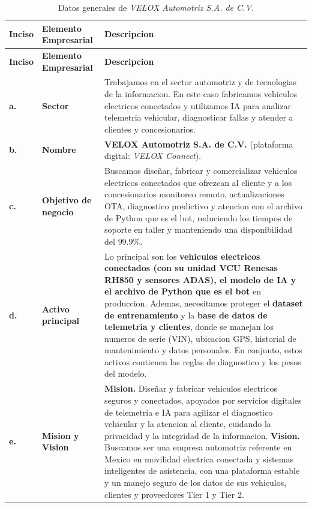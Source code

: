 \documentclass[letterpaper,11pt]{article}
\begin{document}
\vspace{0.2cm}
\begingroup
\footnotesize
\setlength{\tabcolsep}{5pt}
\renewcommand{\arraystretch}{1.32}
\noindent
\begin{longtable}{|C{1.2cm}|L{3.6cm}|L{12.0cm}|}
\caption{Datos generales de \textit{VELOX Automotriz S.A. de C.V.}}
\label{tab:definicion-empresarial} \\
\hline
{}
\textbf{Inciso} & \textbf{Elemento Empresarial} & \textbf{Descripcion} \\
\hline
\endfirsthead
\hline
{}
\textbf{Inciso} & \textbf{Elemento Empresarial} & \textbf{Descripcion} \\
\hline
\endhead
\hline
\endlastfoot

\textbf{a.}
  & \textbf{Sector}
  & Trabajamos en el sector automotriz y de tecnologias de la
informacion. En este caso fabricamos vehiculos electricos conectados
y utilizamos IA para analizar telemetria vehicular, diagnosticar
fallas y atender a clientes y concesionarios. \\
\hline

\textbf{b.}
  & \textbf{Nombre}
  & \textbf{VELOX Automotriz S.A. de C.V.} (plataforma digital:
\textit{VELOX Connect}). \\
\hline

\textbf{c.}
  & \textbf{Objetivo de negocio}
  & Buscamos diseñar, fabricar y comercializar vehiculos electricos
conectados que ofrezcan al cliente y a los concesionarios monitoreo
remoto, actualizaciones OTA, diagnostico predictivo y atencion con
el archivo de Python que es el bot, reduciendo los tiempos de
soporte en taller y manteniendo una disponibilidad del $99.9\%$. \\
\hline

\textbf{d.}
  & \textbf{Activo principal}
  & Lo principal son los \textbf{vehiculos electricos conectados
(con su unidad VCU Renesas RH850 y sensores ADAS), el modelo de IA y
el archivo de Python que es el bot} en produccion. Ademas,
necesitamos proteger el \textbf{dataset de entrenamiento} y la
\textbf{base de datos de telemetria y clientes}, donde se manejan
los numeros de serie (VIN), ubicacion GPS, historial de mantenimiento
y datos personales. En conjunto, estos activos contienen las reglas
de diagnostico y los pesos del modelo. \\
\hline

\textbf{e.}
  & \textbf{Mision y Vision}
  & \textbf{Mision.} Diseñar y fabricar vehiculos electricos seguros y
conectados, apoyados por servicios digitales de telemetria e IA para
agilizar el diagnostico vehicular y la atencion al cliente, cuidando
la privacidad y la integridad de la informacion.\newline
\textbf{Vision.} Buscamos ser una empresa automotriz referente en
Mexico en movilidad electrica conectada y sistemas inteligentes de
asistencia, con una plataforma estable y un manejo seguro de los
datos de sus vehiculos, clientes y proveedores Tier 1 y Tier 2. \\
\hline


\end{longtable}
\end{document}
